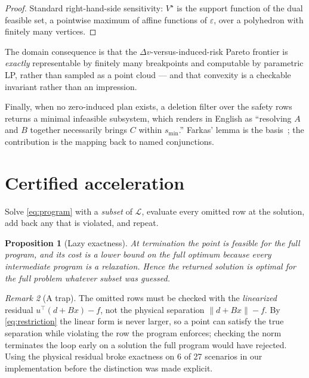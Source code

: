 \documentclass[11pt]{article}
\newtheorem{proposition}{Proposition}
\theoremstyle{definition}
\theoremstyle{remark}
\newtheorem{remark}[proposition]{Remark}
\newcommand{\dv}{\Delta v}
\newcommand{\norm}[1]{\lVert #1 \rVert}
\begin{document}
\begin{proof}
Standard right-hand-side sensitivity: $V^\star$ is the support function of the
dual feasible set, a pointwise maximum of affine functions of $\varepsilon$,
over a polyhedron with finitely many vertices.
\end{proof}

The domain consequence is that the $\dv$-versus-induced-risk Pareto frontier is
\emph{exactly} representable by finitely many breakpoints and computable by
parametric LP, rather than sampled as a point cloud --- and that convexity is a
checkable invariant rather than an impression.

Finally, when no zero-induced plan exists, a deletion filter over the safety
rows returns a minimal infeasible subsystem, which renders in English as
``resolving $A$ and $B$ together necessarily brings $C$ within $s_{\min}$.''
Farkas' lemma is the basis~\cite{schrijver1986}; the contribution is the
mapping back to named conjunctions.

\section{Certified acceleration}
\label{sec:accel}

Solve \eqref{eq:program} with a \emph{subset} of $\mathcal{L}$, evaluate every
omitted row at the solution, add back any that is violated, and repeat.

\begin{proposition}[Lazy exactness]
\label{prop:lazy}
At termination the point is feasible for the full program, and its cost is a
lower bound on the full optimum because every intermediate program is a
relaxation. Hence the returned solution is optimal for the full problem
whatever subset was guessed.
\end{proposition}

\begin{remark}[A trap]
The omitted rows must be checked with the \emph{linearized} residual
$u^{\!\top}(d + Bx) - f$, not the physical separation $\norm{d+Bx} - f$. By
\eqref{eq:restriction} the linear form is never larger, so a point can satisfy
the true separation while violating the row the program enforces; checking the
norm terminates the loop early on a solution the full program would have
rejected. Using the physical residual broke exactness on 6 of 27 scenarios in
our implementation before the distinction was made explicit.
\end{remark}
\end{document}
